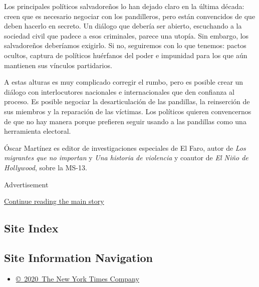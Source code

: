 Los principales políticos salvadoreños lo han dejado claro en la última
década: creen que es necesario negociar con los pandilleros, pero están
convencidos de que deben hacerlo en secreto. Un diálogo que debería ser
abierto, escuchando a la sociedad civil que padece a esos criminales,
parece una utopía. Sin embargo, los salvadoreños deberíamos exigirlo. Si
no, seguiremos con lo que tenemos: pactos ocultos, captura de políticos
huérfanos del poder e impunidad para los que aún mantienen sus vínculos
partidarios.

A estas alturas es muy complicado corregir el rumbo, pero es posible
crear un diálogo con interlocutores nacionales e internacionales que den
confianza al proceso. Es posible negociar la desarticulación de las
pandillas, la reinserción de sus miembros y la reparación de las
víctimas. Los políticos quieren convencernos de que no hay manera porque
prefieren seguir usando a las pandillas como una herramienta electoral.

Óscar Martínez es editor de investigaciones especiales de El Faro, autor
de \emph{Los migrantes que no importan} y \emph{Una historia de
violencia} y coautor de \emph{El Niño de Hollywood}, sobre la MS-13.

Advertisement

\protect\hyperlink{after-bottom}{Continue reading the main story}

\hypertarget{site-index}{%
\subsection{Site Index}\label{site-index}}

\hypertarget{site-information-navigation}{%
\subsection{Site Information
Navigation}\label{site-information-navigation}}

\begin{itemize}
\tightlist
\item
  \href{https://help.nytimes.com/hc/en-us/articles/115014792127-Copyright-notice}{©~2020~The
  New York Times Company}
\end{itemize}

